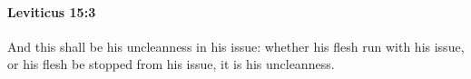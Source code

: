 
		\paragraph{Leviticus 15:3} %
			\label{LEVITICUS-15-3}

			And this shall be his uncleanness in his issue: whether his flesh run with his issue, or his flesh be stopped from his issue, it is his uncleanness.


